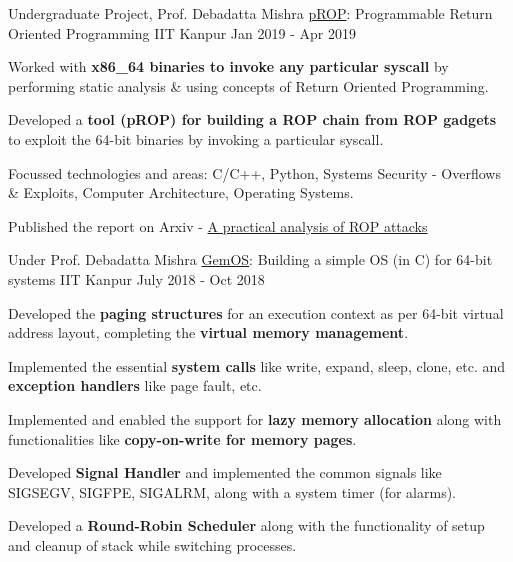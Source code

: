 \begin{cventries}


  \cventry
    {Undergraduate Project, Prof. Debadatta Mishra} %
    {\href{https://arxiv.org/abs/2111.03537}{pROP}: Programmable Return Oriented Programming} %
    {IIT Kanpur} %
    {Jan 2019 - Apr 2019} %
    {
      \begin{cvitems} %
      \item {Worked with \textbf{x86\_64 binaries to invoke any particular syscall} by performing static analysis \& using concepts of Return Oriented Programming.}
      \item {Developed a \textbf{tool (pROP) for building a ROP chain from ROP gadgets} to exploit the 64-bit binaries by invoking a particular syscall.}
      \item {Focussed technologies and areas: C/C++, Python, Systems Security - Overflows \& Exploits, Computer Architecture, Operating Systems.}
      \item {Published the report on Arxiv - \href{https://arxiv.org/abs/2111.03537}{A practical analysis of ROP attacks}}
      \end{cvitems}
    }




  \cventry
    {Under Prof. Debadatta Mishra} %
    {\href{https://dl.acm.org/doi/10.1145/3338698.3338887}{GemOS}: Building a simple OS (in C) for 64-bit systems} %
    {IIT Kanpur} %
    {July 2018 - Oct 2018} %
    {
      \begin{cvitems} %
      \item {Developed the \textbf{paging structures} for an execution context as per 64-bit virtual address layout, completing the \textbf{virtual memory management}.}
      \item {Implemented the essential \textbf{system calls} like write, expand, sleep, clone, etc. and \textbf{exception handlers} like page fault, etc.}
      \item {Implemented and enabled the support for \textbf{lazy memory allocation} along with functionalities like \textbf{copy-on-write for memory pages}.}
      \item {Developed \textbf{Signal Handler} and implemented the common signals like SIGSEGV, SIGFPE, SIGALRM, along with a system timer (for alarms).}
      \item {Developed a \textbf{Round-Robin Scheduler} along with the functionality of setup and cleanup of stack while switching processes.}
      \end{cvitems}
    }


\end{cventries}
